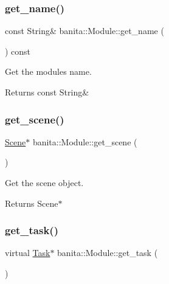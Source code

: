 \mbox{\label{classbanita_1_1_module_a9a17fbfe0d05359427f2e9cbf956852c}} 
\subsubsection{\texorpdfstring{get\_name()}{get\_name()}}
{\footnotesize\ttfamily const String\& banita\+::\+Module\+::get\+\_\+name (\begin{DoxyParamCaption}{ }\end{DoxyParamCaption}) const\hspace{0.3cm}{\ttfamily [inline]}}



Get the module\textquotesingle{}s name. 

\begin{DoxyReturn}{Returns}
const String\& 
\end{DoxyReturn}
\mbox{\label{classbanita_1_1_module_aa2f74f6ba86841383c427199a03b0f9a}} 
\subsubsection{\texorpdfstring{get\_scene()}{get\_scene()}}
{\footnotesize\ttfamily \mbox{\hyperlink{classbanita_1_1_scene}{Scene}}$\ast$ banita\+::\+Module\+::get\+\_\+scene (\begin{DoxyParamCaption}{ }\end{DoxyParamCaption})\hspace{0.3cm}{\ttfamily [inline]}}



Get the scene object. 

\begin{DoxyReturn}{Returns}
Scene$\ast$ 
\end{DoxyReturn}
\mbox{\label{classbanita_1_1_module_a8e29c0b6d7e11a39dac3c0879ef513d9}} 
\subsubsection{\texorpdfstring{get\_task()}{get\_task()}}
{\footnotesize\ttfamily virtual \mbox{\hyperlink{classbanita_1_1_task}{Task}}$\ast$ banita\+::\+Module\+::get\+\_\+task (\begin{DoxyParamCaption}{ }\end{DoxyParamCaption})\hspace{0.3cm}{\ttfamily [pure virtual]}}



